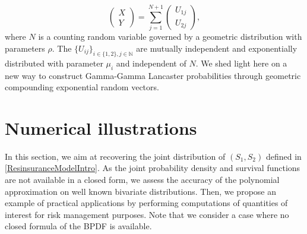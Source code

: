 \begin{equation}
\label{DBVEDefinition}
\left( \begin{array}{l}
X \\
Y \end{array}
\right)  =
 \displaystyle\sum_{j=1}^{N+1}
\left( \begin{array}{l}
U_{1j} \\
U_{2j} \end{array}
\right),
\end{equation}
where $N$ is a counting random variable governed by a geometric distribution with parameters $\rho$. The $\{U_{ij}\}_{i\in\{1,2\},j\in\mathbb{N}}$ are mutually independent and exponentially distributed with parameter $\mu_{i}$ and independent of $N$. We shed light here on a new way to construct Gamma-Gamma Lancaster probabilities through geometric compounding exponential random vectors. 

\section{Numerical illustrations}\label{NumericaIllustration}
In this section, we aim at recovering the joint distribution of $(S_{1},S_{2})$ defined in \eqref{ResinsuranceModelIntro}. As the joint probability density and survival functions are not available in a closed form, we assess the accuracy of the polynomial approximation on well known bivariate distributions. Then, we propose an example of practical applications by performing computations of quantities of interest for risk management purposes. Note that we consider a case where no closed formula of the BPDF is available. 
